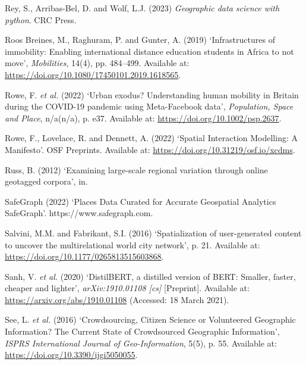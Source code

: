 \documentclass[
  letterpaper,
  11pt,
  english,
  onehalfspacing,
  headsepline]{MastersDoctoralThesis}
\newlength{\cslhangindent}
\newlength{\cslentryspacingunit} %
\newenvironment{CSLReferences}[2] %
 {%
  \setlength{\parindent}{0pt}
  \ifodd #1
  \let\oldpar\par
  \def\par{\hangindent=\cslhangindent\oldpar}
  \fi
  \setlength{\parskip}{#2\cslentryspacingunit}
 }%
 {}
\begin{document}
\begin{CSLReferences}{0}{0}
\leavevmode{}%
Rey, S., Arribas-Bel, D. and Wolf, L.J. (2023) \emph{Geographic data
science with python}. {CRC Press}.

\leavevmode{}%
Roos Breines, M., Raghuram, P. and Gunter, A. (2019) {`Infrastructures
of immobility: Enabling international distance education students in
{Africa} to not move'}, \emph{Mobilities}, 14(4), pp. 484--499.
Available at: \url{https://doi.org/10.1080/17450101.2019.1618565}.

\leavevmode{}%
Rowe, F. \emph{et al.} (2022) {`Urban exodus? {Understanding} human
mobility in {Britain} during the {COVID-19} pandemic using
{Meta-Facebook} data'}, \emph{Population, Space and Place}, n/a(n/a), p.
e37. Available at: \url{https://doi.org/10.1002/psp.2637}.

\leavevmode{}%
Rowe, F., Lovelace, R. and Dennett, A. (2022) {`Spatial {Interaction
Modelling}: {A Manifesto}'}. {OSF Preprints}. Available at:
\url{https://doi.org/10.31219/osf.io/xcdms}.

\leavevmode{}%
Russ, B. (2012) {`Examining large-scale regional variation through
online geotagged corpora'}, in.

\leavevmode{}%
SafeGraph (2022) {`Places {Data Curated} for {Accurate Geospatial
Analytics} \textbar{} {SafeGraph}'}. https://www.safegraph.com.

\leavevmode{}%
Salvini, M.M. and Fabrikant, S.I. (2016) {`Spatialization of
user-generated content to uncover the multirelational world city
network'}, p. 21. Available at:
\url{https://doi.org/10.1177/0265813515603868}.

\leavevmode{}%
Sanh, V. \emph{et al.} (2020) {`{DistilBERT}, a distilled version of
{BERT}: Smaller, faster, cheaper and lighter'}, \emph{arXiv:1910.01108
{[}cs{]}} {[}Preprint{]}. Available at:
\url{https://arxiv.org/abs/1910.01108} (Accessed: 18 March 2021).

\leavevmode{}%
See, L. \emph{et al.} (2016) {`Crowdsourcing, {Citizen Science} or
{Volunteered Geographic Information}? {The Current State} of
{Crowdsourced Geographic Information}'}, \emph{ISPRS International
Journal of Geo-Information}, 5(5), p. 55. Available at:
\url{https://doi.org/10.3390/ijgi5050055}.


\end{CSLReferences}
\end{document}
